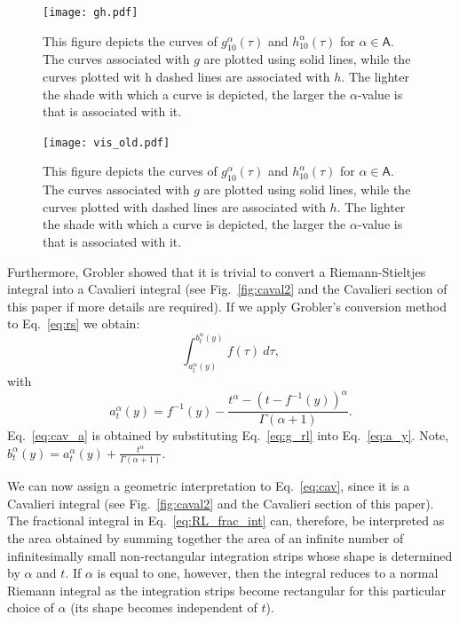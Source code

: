 \documentclass[twoside,reqno,11pt]{fcaa-var} %
\begin{document}
\begin{figure}[htb]
\centering
\texttt{[image: gh.pdf]}
\caption{This figure depicts the curves of $g_{10}^{\alpha}(\tau)$ and $h_{10}^{\alpha}(\tau)$ for $\alpha\in\mathsf{A}$. The curves associated with $g$ are plotted using 
solid lines, while the curves plotted wit h dashed lines are associated with $h$. The lighter the shade with which a curve is depicted, the larger the $\alpha$-value is that is associated with it.
}
\label{fig:gandh}
\end{figure}

\begin{figure}[htb]
\centering
\texttt{[image: vis\_old.pdf]}
\caption{This figure depicts the curves of $g_{10}^{\alpha}(\tau)$ and $h_{10}^{\alpha}(\tau)$ for $\alpha\in\mathsf{A}$. The curves associated with $g$ are plotted using 
solid lines, while the curves plotted with dashed lines are associated with $h$. The lighter the shade with which a curve is depicted, the larger the $\alpha$-value is that is associated with it.
}
\label{fig:gandh}
\end{figure}


\noindent
Furthermore, Grobler showed that it is trivial to convert a Riemann-Stieltjes integral into a Cavalieri integral \cite{ackermann12,grobler19} (see Fig.~\ref{fig:caval2} and the Cavalieri section of this paper if more details are required). If we apply Grobler's conversion method to Eq.~\eqref{eq:rs} we obtain:
\begin{equation}
\label{eq:cav}
\int_{a_t^{\alpha}(y)}^{b_t^{\alpha}(y)} f(\tau)~d\tau, 
\end{equation}
with
\begin{equation}
\label{eq:cav_a}
a_t^{\alpha}(y) = f^{-1}(y) - \frac{t^{\alpha}-(t-f^{-1}(y))^{\alpha}}{\Gamma(\alpha+1)}.
\end{equation}
Eq.~\eqref{eq:cav_a} is obtained by substituting Eq.~\eqref{eq:g_rl} into Eq.~\eqref{eq:a_y}. Note, $b_t^{\alpha}(y) = a_t^{\alpha}(y) + \frac{t^{\alpha}}{\Gamma(\alpha+1)}$. 

\noindent
We can now assign a geometric interpretation to Eq.~\eqref{eq:cav}, since it is a Cavalieri integral (see Fig.~\ref{fig:caval2} and the Cavalieri section of this paper). The fractional integral in Eq.~\eqref{eq:RL_frac_int} can, therefore, be interpreted as the area obtained 
by summing together the area of an infinite number of infinitesimally small non-rectangular integration strips whose shape is determined by $\alpha$ and $t$. If $\alpha$ is equal to one, however, then the integral reduces to a normal Riemann integral as the integration strips become rectangular for this particular choice of $\alpha$ (its shape becomes independent of $t$).\\
\end{document}
